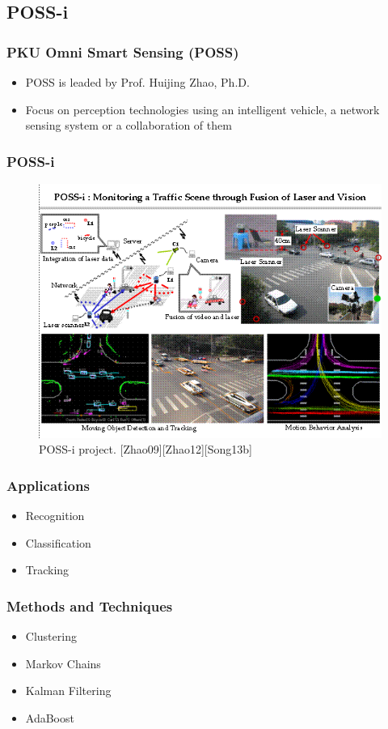 \documentclass{beamer}
\begin{document}
\subsection{POSS-i}
\frame
{
	\frametitle{PKU Omni Smart Sensing (POSS)}
	\begin{itemize}
		\item POSS is leaded by Prof. Huijing Zhao, Ph.D.
		\item Focus on perception technologies using an intelligent vehicle, a network sensing system or a collaboration of them
	\end{itemize}
}
\frame
{
	\frametitle{POSS-i}	
	\begin{figure}
		\includegraphics[scale=0.4]{fig/possi.png}
		\caption{POSS-i project. [Zhao09][Zhao12][Song13b]}
	\end{figure}
}
\frame
{
	\frametitle{Applications}
	\begin{itemize}
		\item Recognition
		\item Classification
		\item Tracking
	\end{itemize}
}
\frame
{
	\frametitle{Methods and Techniques}
	\begin{itemize}
		\item Clustering
		\item Markov Chains
		\item Kalman Filtering
		\item AdaBoost
	\end{itemize}
}
\end{document}
